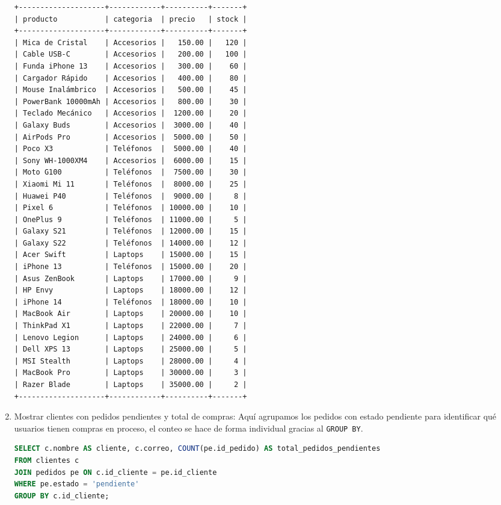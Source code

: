 \documentclass[10pt,letterpaper]{article}
\begin{document}
\begin{enumerate}
\begin{verbatim}
+--------------------+------------+----------+-------+
| producto           | categoria  | precio   | stock |
+--------------------+------------+----------+-------+
| Mica de Cristal    | Accesorios |   150.00 |   120 |
| Cable USB-C        | Accesorios |   200.00 |   100 |
| Funda iPhone 13    | Accesorios |   300.00 |    60 |
| Cargador Rápido    | Accesorios |   400.00 |    80 |
| Mouse Inalámbrico  | Accesorios |   500.00 |    45 |
| PowerBank 10000mAh | Accesorios |   800.00 |    30 |
| Teclado Mecánico   | Accesorios |  1200.00 |    20 |
| Galaxy Buds        | Accesorios |  3000.00 |    40 |
| AirPods Pro        | Accesorios |  5000.00 |    50 |
| Poco X3            | Teléfonos  |  5000.00 |    40 |
| Sony WH-1000XM4    | Accesorios |  6000.00 |    15 |
| Moto G100          | Teléfonos  |  7500.00 |    30 |
| Xiaomi Mi 11       | Teléfonos  |  8000.00 |    25 |
| Huawei P40         | Teléfonos  |  9000.00 |     8 |
| Pixel 6            | Teléfonos  | 10000.00 |    10 |
| OnePlus 9          | Teléfonos  | 11000.00 |     5 |
| Galaxy S21         | Teléfonos  | 12000.00 |    15 |
| Galaxy S22         | Teléfonos  | 14000.00 |    12 |
| Acer Swift         | Laptops    | 15000.00 |    15 |
| iPhone 13          | Teléfonos  | 15000.00 |    20 |
| Asus ZenBook       | Laptops    | 17000.00 |     9 |
| HP Envy            | Laptops    | 18000.00 |    12 |
| iPhone 14          | Teléfonos  | 18000.00 |    10 |
| MacBook Air        | Laptops    | 20000.00 |    10 |
| ThinkPad X1        | Laptops    | 22000.00 |     7 |
| Lenovo Legion      | Laptops    | 24000.00 |     6 |
| Dell XPS 13        | Laptops    | 25000.00 |     5 |
| MSI Stealth        | Laptops    | 28000.00 |     4 |
| MacBook Pro        | Laptops    | 30000.00 |     3 |
| Razer Blade        | Laptops    | 35000.00 |     2 |
+--------------------+------------+----------+-------+
    \end{verbatim}

    \item Mostrar clientes con pedidos pendientes y total de compras:
    Aqu\'i agrupamos los pedidos con estado pendiente para identificar qu\'e usuarios tienen compras en proceso, el conteo se hace de forma individual gracias al \texttt{GROUP BY}.

    \begin{lstlisting}[language=SQL, frame=single, caption={Consulta de pedidos pendientes}]
SELECT c.nombre AS cliente, c.correo, COUNT(pe.id_pedido) AS total_pedidos_pendientes
FROM clientes c
JOIN pedidos pe ON c.id_cliente = pe.id_cliente
WHERE pe.estado = 'pendiente'
GROUP BY c.id_cliente;
    \end{lstlisting}


\end{enumerate}
\end{document}
